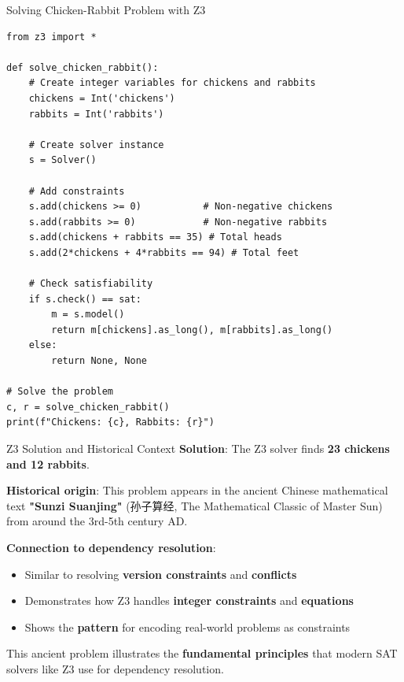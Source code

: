 \documentclass{beamer}
\begin{document}
\begin{frame}[fragile,t]{Solving Chicken-Rabbit Problem with Z3}
\begin{verbatim}
from z3 import *

def solve_chicken_rabbit():
    # Create integer variables for chickens and rabbits
    chickens = Int('chickens')
    rabbits = Int('rabbits')
    
    # Create solver instance
    s = Solver()
    
    # Add constraints
    s.add(chickens >= 0)           # Non-negative chickens
    s.add(rabbits >= 0)            # Non-negative rabbits
    s.add(chickens + rabbits == 35) # Total heads
    s.add(2*chickens + 4*rabbits == 94) # Total feet
    
    # Check satisfiability
    if s.check() == sat:
        m = s.model()
        return m[chickens].as_long(), m[rabbits].as_long()
    else:
        return None, None

# Solve the problem
c, r = solve_chicken_rabbit()
print(f"Chickens: {c}, Rabbits: {r}")
\end{verbatim}
\end{frame}

\begin{frame}[t]{Z3 Solution and Historical Context}
\textbf{Solution}: The Z3 solver finds \textbf{23 chickens and 12 rabbits}.

\bigskip

\textbf{Historical origin}: This problem appears in the ancient Chinese mathematical text \textbf{"Sunzi Suanjing"} (孙子算经, The Mathematical Classic of Master Sun) from around the 3rd-5th century AD.

\bigskip

\textbf{Connection to dependency resolution}:
\begin{itemize}
\item Similar to resolving \textbf{version constraints} and \textbf{conflicts}
\item Demonstrates how Z3 handles \textbf{integer constraints} and \textbf{equations}
\item Shows the \textbf{pattern} for encoding real-world problems as constraints
\end{itemize}

This ancient problem illustrates the \textbf{fundamental principles} that modern SAT solvers like Z3 use for dependency resolution.
\end{frame}
\end{document}
